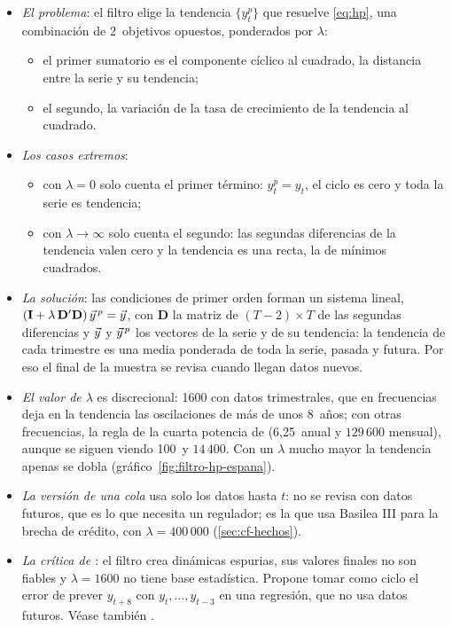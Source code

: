 \documentclass[11pt]{article}
\begin{document}
\begin{itemize}
\item \emph{El problema}: el filtro elige la tendencia $\{y^p_t\}$ que resuelve \eqref{eq:hp}, una combinación de 2~objetivos opuestos, ponderados por $\lambda$:
  \begin{itemize}
  \item el primer sumatorio es el componente cíclico al cuadrado, la distancia entre la serie y su tendencia;
  \item el segundo, la variación de la tasa de crecimiento de la tendencia al cuadrado.
  \end{itemize}
\item \emph{Los casos extremos}:
  \begin{itemize}
  \item con $\lambda=0$ solo cuenta el primer término: $y^p_t=y_t$, el ciclo es cero y toda la serie es tendencia;
  \item con $\lambda\to\infty$ solo cuenta el segundo: las segundas diferencias de la tendencia valen cero y la tendencia es una recta, la de mínimos cuadrados.
  \end{itemize}
\item \emph{La solución}: las condiciones de primer orden forman un sistema lineal, $(\mathbf{I}+\lambda\,\mathbf{D}'\mathbf{D})\,\vec{y}^{\,p}=\vec{y}$, con $\mathbf{D}$ la matriz de $(T-2)\times T$ de las segundas diferencias y $\vec{y}$ y $\vec{y}^{\,p}$ los vectores de la serie y de su tendencia: la tendencia de cada trimestre es una media ponderada de toda la serie, pasada y futura. Por eso el final de la muestra se revisa cuando llegan datos nuevos.
\item \emph{El valor de $\lambda$} es discrecional: 1600 con datos trimestrales\nocite{HodrickPrescott1997}, que en frecuencias deja en la tendencia las oscilaciones de más de unos 8~años; con otras frecuencias, la regla de la cuarta potencia de \textcite{RavnUhlig2002} (6,25~anual y $129\,600$ mensual), aunque se siguen viendo 100~y $14\,400$. Con un $\lambda$ mucho mayor la tendencia apenas se dobla (gráfico~\ref{fig:filtro-hp-espana}).
\item \emph{La versión de una cola} usa solo los datos hasta $t$: no se revisa con datos futuros, que es lo que necesita un regulador; es la que usa Basilea III para la brecha de crédito, con $\lambda=400\,000$ (\ref{sec:cf-hechos}).
\item \emph{La crítica de \textcite{Hamilton2018Why}}: el filtro crea dinámicas espurias, sus valores finales no son fiables y $\lambda=1600$ no tiene base estadística. Propone tomar como ciclo el error de prever $y_{t+8}$ con $y_t,\dots,y_{t-3}$ en una regresión, que no usa datos futuros. Véase también \textcite{PhillipsJin2021HP}.

\end{itemize}
\end{document}
